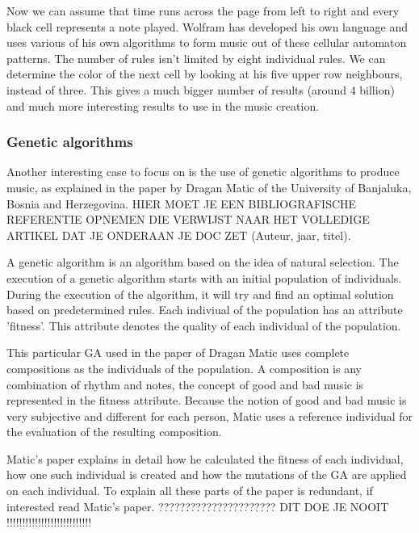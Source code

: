 \documentclass[12pt]{article}
\begin{document}
Now we can assume that time runs across the page from left to right and every black cell represents a note played. Wolfram has developed his own language and uses various of his own algorithms to form music out of these cellular automaton patterns.
\newline
\newline
The number of rules isn't limited by eight individual rules. We can determine the color of the next cell by looking at his five upper row neighbours, instead of three. This gives a much bigger number of results (around 4 billion) and much more interesting results to use in the music creation. 

\subsubsection{Genetic algorithms}

Another interesting case to focus on is the use of genetic algorithms to produce music, as explained in the paper by Dragan Matic of the University of Banjaluka, Bosnia and Herzegovina. HIER MOET JE EEN BIBLIOGRAFISCHE REFERENTIE OPNEMEN DIE VERWIJST NAAR HET VOLLEDIGE ARTIKEL DAT JE ONDERAAN JE DOC ZET (Auteur, jaar, titel).
\newline

A genetic algorithm is an algorithm based on the idea of natural selection. The execution of a genetic algorithm starts with an initial population of individuals. During the execution of the algorithm, it will try and find an optimal solution based on predetermined rules. Each indiviual of the population has an attribute 'fitness'. This attribute denotes the quality of each individual of the population.
\newline
\newline

This particular GA used in the paper of Dragan Matic uses complete compositions as the individuals of the population. A composition is any combination of rhythm and notes, the concept of good and bad music is represented in the fitness attribute. Because the notion of good and bad music is very subjective and different for each person, Matic uses a reference individual for the evaluation of the resulting composition.
\newline

Matic's paper explains in detail how he calculated the fitness of each individual, how one such individual is created and how the mutations of the GA are applied on each individual. To explain all these parts of the paper is redundant, if interested read Matic's paper. ?????????????????????? DIT DOE JE NOOIT !!!!!!!!!!!!!!!!!!!!!!!!!!!
\newline
\end{document}

